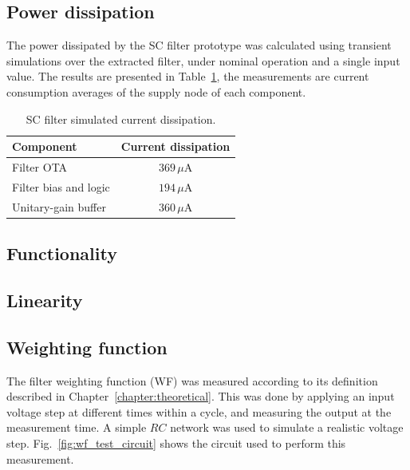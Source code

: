 \subsection{Power dissipation} 

The power dissipated by the SC filter prototype was calculated using transient simulations over the extracted filter, under nominal operation and a single input value. The results are presented in Table~\ref{tab:power_dissipation}, the measurements are current consumption averages of the supply node of each component. 

\begin{table}
	\begin{center}
		\begin{tabular}{|l|c|}\hline
			{\bf Component} & {\bf Current dissipation} \\ \hline\hline
			Filter OTA & $369\,\mu\text{A}$ \\ \hline
			Filter bias and logic & $194\,\mu\text{A}$ \\ \hline
			Unitary-gain buffer & $360\,\mu\text{A}$ \\ \hline
		\end{tabular}
		\vspace*{5pt}
		\caption{SC filter simulated current dissipation.}
		\label{tab:power_dissipation}
	\end{center}
\end{table}


\subsection{Functionality} 
\subsection{Linearity}
\subsection{Weighting function}
The filter weighting function (WF) was measured according to its definition described in Chapter~\ref{chapter:theoretical}. This was done by applying an input voltage step at different times within a cycle, and measuring the output at the measurement time. A simple $RC$ network was used to simulate a realistic voltage step. Fig.~\ref{fig:wf_test_circuit} shows the circuit used to perform this measurement. 

